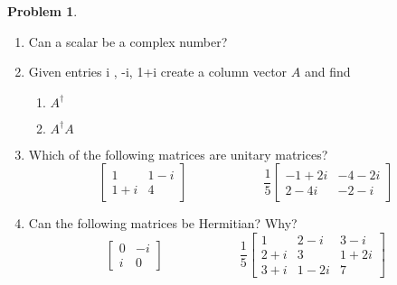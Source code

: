 \documentclass[10pt]{article}
\theoremstyle{definition}
\newtheorem{problem}{Problem}
\begin{document}
\begin{problem}~
\begin{enumerate}[label=(\alph*)]
  \item Can a scalar be a complex number?
  \item Given entries i , -i, 1+i create a column vector $A$ and find
        \begin{enumerate}[label=(\roman*)]
          \item $A^\dagger$
          \item $A^\dagger A$
        \end{enumerate}
  \item Which of the following matrices are unitary matrices?
        $$
          \begin{bmatrix}
            1   & 1-i \\
            1+i & 4
          \end{bmatrix}\qquad\qquad\qquad
          \frac{1}{5}\begin{bmatrix}
            -1+2i & -4-2i \\
            2-4i  & -2-i
          \end{bmatrix}
        $$
  \item Can the following matrices be Hermitian? Why?
        $$
          \begin{bmatrix}
            0 & -i \\
            i & 0
          \end{bmatrix}\qquad\qquad\qquad
          \frac{1}{5}\begin{bmatrix}
            1   & 2-i  & 3-i  \\
            2+i & 3    & 1+2i \\
            3+i & 1-2i & 7
          \end{bmatrix}
        $$
\end{enumerate}
\end{problem}
\end{document}
